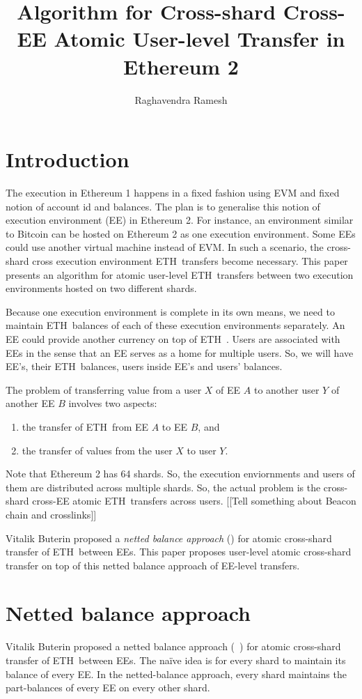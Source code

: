 \documentclass{article}
\title{Algorithm for Cross-shard Cross-EE Atomic User-level \eth Transfer in Ethereum 2}
\author{Raghavendra Ramesh}
\newcommand{\eth}[0]{ETH~}
\begin{document}
\maketitle

\section{Introduction}

The execution in Ethereum 1 happens in a fixed fashion using EVM and fixed notion of account id and balances. The plan is to generalise this notion of execution environment (EE) in Ethereum 2. For instance, an environment similar to Bitcoin can be hosted on Ethereum 2 as one execution environment.  Some EEs could use another virtual machine instead of EVM. In such a scenario, the cross-shard cross execution environment \eth transfers become necessary. This paper presents an algorithm for atomic user-level \eth transfers between two execution environments hosted on two different shards.

Because one execution environment is complete in its own means, we need to maintain \eth balances of each of these execution environments separately. An EE could provide another currency on top of \eth. Users are associated with EEs in the sense that an EE serves as a home for multiple users. So, we will have EE's, their \eth balances, users inside EE's and users' balances.

The problem of transferring value from a user $X$ of EE $A$ to another user $Y$ of another EE $B$ involves two aspects:
\begin{enumerate}
    \item the transfer of \eth from EE $A$ to EE $B$, and
    \item the transfer of values from the user $X$ to user $Y$.
\end{enumerate}
Note that Ethereum 2 has 64 shards. So, the execution enviornments and users of them are distributed across multiple shards. So, the actual problem is the cross-shard cross-EE atomic \eth transfers across users. [[Tell something about Beacon chain and crosslinks]]

Vitalik Buterin proposed a {\em netted balance approach} (\cite{netted-balance}) for atomic cross-shard transfer of \eth between EEs. This paper proposes user-level atomic cross-shard transfer on top of this netted balance approach of EE-level transfers.

\section{Netted balance approach}
\label{sec:netted-balance}
Vitalik Buterin proposed a netted balance approach (~\cite{netted-balance}) for atomic cross-shard transfer of \eth between EEs. The naïve idea is for every shard to maintain its balance of every EE. In the netted-balance approach, every shard maintains the part-balances of every EE on every other shard. 
\end{document}

